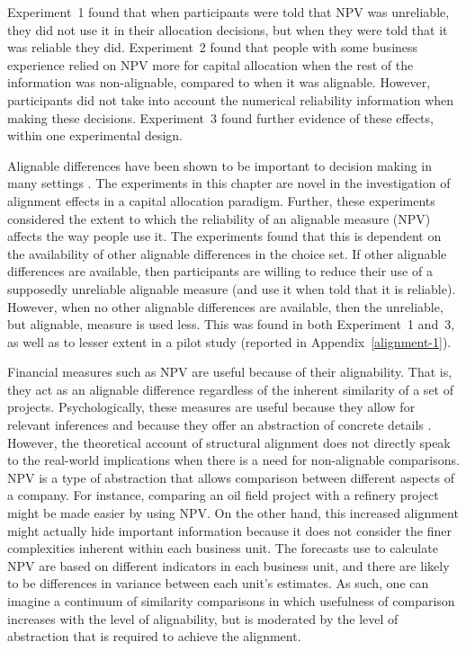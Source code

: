 \documentclass[a4paper, nobind, dvipsnames]{templates/ociamthesis}
\theoremstyle{definition}
\theoremstyle{definition}
\theoremstyle{definition}
\theoremstyle{definition}
\theoremstyle{remark}
\begin{document}
Experiment~1 found that when participants were told that NPV was unreliable,
they did not use it in their allocation decisions, but when they were told that
it was reliable they did. Experiment~2 found that people with some business
experience relied on NPV more for capital allocation when the rest of the
information was non-alignable, compared to when it was alignable. However,
participants did not take into account the numerical reliability information
when making these decisions. Experiment~3 found further evidence of these
effects, within one experimental design.

Alignable differences have been shown to be important to decision making in many
settings \autocite{markman2010,markman1995}. The experiments in this chapter are novel
in the investigation of alignment effects in a capital allocation paradigm.
Further, these experiments considered the extent to which the reliability of an
alignable measure (NPV) affects the way people use it. The experiments found
that this is dependent on the availability of other alignable differences in the
choice set. If other alignable differences are available, then participants are
willing to reduce their use of a supposedly unreliable alignable measure (and
use it when told that it is reliable). However, when no other alignable
differences are available, then the unreliable, but alignable, measure is used
less. This was found in both Experiment~1 and~3, as well as to lesser extent in
a pilot study (reported in Appendix~\ref{alignment-1}).

Financial measures such as NPV are useful because of their alignability. That
is, they act as an alignable difference regardless of the inherent similarity of
a set of projects. Psychologically, these measures are useful because they allow
for relevant inferences \autocite{lassaline1996} and because they offer an abstraction
of concrete details \autocite{doumas2013}. However, the theoretical account of
structural alignment does not directly speak to the real-world implications when
there is a need for non-alignable comparisons. NPV is a type of abstraction that
allows comparison between different aspects of a company. For instance,
comparing an oil field project with a refinery project might be made easier by
using NPV. On the other hand, this increased alignment might actually hide
important information because it does not consider the finer complexities
inherent within each business unit. The forecasts use to calculate NPV are based
on different indicators in each business unit, and there are likely to be
differences in variance between each unit's estimates. As such, one can imagine
a continuum of similarity comparisons in which usefulness of comparison
increases with the level of alignability, but is moderated by the level of
abstraction that is required to achieve the alignment.
\end{document}
